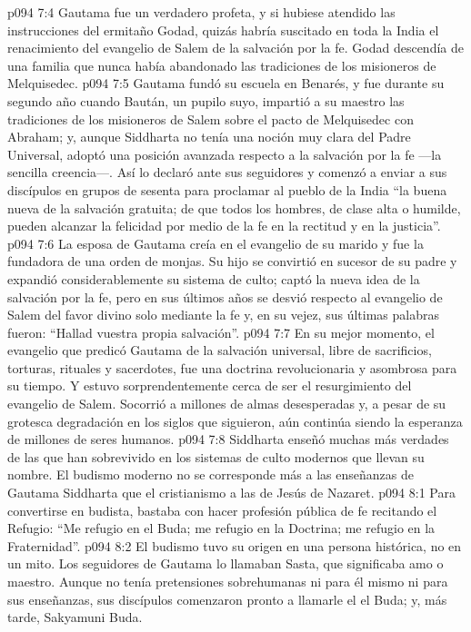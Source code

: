 \vs p094 7:4 Gautama fue un verdadero profeta, y si hubiese atendido las instrucciones del ermitaño Godad, quizás habría suscitado en toda la India el renacimiento del evangelio de Salem de la salvación por la fe. Godad descendía de una familia que nunca había abandonado las tradiciones de los misioneros de Melquisedec.
\vs p094 7:5 Gautama fundó su escuela en Benarés, y fue durante su segundo año cuando Baután, un pupilo suyo, impartió a su maestro las tradiciones de los misioneros de Salem sobre el pacto de Melquisedec con Abraham; y, aunque Siddharta no tenía una noción muy clara del Padre Universal, adoptó una posición avanzada respecto a la salvación por la fe ---la sencilla creencia---. Así lo declaró ante sus seguidores y comenzó a enviar a sus discípulos en grupos de sesenta para proclamar al pueblo de la India “la buena nueva de la salvación gratuita; de que todos los hombres, de clase alta o humilde, pueden alcanzar la felicidad por medio de la fe en la rectitud y en la justicia”.
\vs p094 7:6 La esposa de Gautama creía en el evangelio de su marido y fue la fundadora de una orden de monjas. Su hijo se convirtió en sucesor de su padre y expandió considerablemente su sistema de culto; captó la nueva idea de la salvación por la fe, pero en sus últimos años se desvió respecto al evangelio de Salem del favor divino solo mediante la fe y, en su vejez, sus últimas palabras fueron: “Hallad vuestra propia salvación”.
\vs p094 7:7 \pc En su mejor momento, el evangelio que predicó Gautama de la salvación universal, libre de sacrificios, torturas, rituales y sacerdotes, fue una doctrina revolucionaria y asombrosa para su tiempo. Y estuvo sorprendentemente cerca de ser el resurgimiento del evangelio de Salem. Socorrió a millones de almas desesperadas y, a pesar de su grotesca degradación en los siglos que siguieron, aún continúa siendo la esperanza de millones de seres humanos.
\vs p094 7:8 Siddharta enseñó muchas más verdades de las que han sobrevivido en los sistemas de culto modernos que llevan su nombre. El budismo moderno no se corresponde más a las enseñanzas de Gautama Siddharta que el cristianismo a las de Jesús de Nazaret.
\vs p094 8:1 Para convertirse en budista, bastaba con hacer profesión pública de fe recitando el Refugio: “Me refugio en el Buda; me refugio en la Doctrina; me refugio en la Fraternidad”.
\vs p094 8:2 El budismo tuvo su origen en una persona histórica, no en un mito. Los seguidores de Gautama lo llamaban Sasta, que significaba amo o maestro. Aunque no tenía pretensiones sobrehumanas ni para él mismo ni para sus enseñanzas, sus discípulos comenzaron pronto a llamarle el  el Buda; y, más tarde, Sakyamuni Buda.
